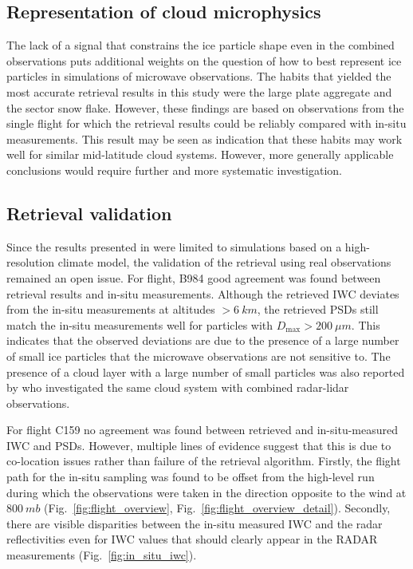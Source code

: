 \documentclass[journal abbreviation, manuscript]{copernicus}
\begin{document}
\subsection{Representation of cloud microphysics}

The lack of a signal that constrains the ice particle shape even in the combined
observations puts additional weights on the question of how to best represent
ice particles in simulations of microwave observations. The habits that yielded
the most accurate retrieval results in this study were the large plate aggregate
and the sector snow flake. However, these findings are based on observations
from the single flight for which the retrieval results could be reliably
compared with in-situ measurements. This result may be seen as indication that
these habits may work well for similar mid-latitude cloud systems. However, more
generally applicable conclusions would require further and more systematic
investigation.

\subsection{Retrieval validation}

Since the results presented in \citet{pfreundschuh19} were limited to
simulations based on a high-resolution climate model, the validation of the
retrieval using real observations remained an open issue. For flight, B984 good
agreement was found between retrieval results and in-situ measurements. Although
the retrieved IWC deviates from the in-situ measurements at altitudes $>
6\ \unit{km}$, the retrieved PSDs still match the in-situ measurements well for
particles with $D_\text{max} > 200\ \unit{\mu m}$. This indicates that the
observed deviations are due to the presence of a large number of small ice
particles that the microwave observations are not sensitive to. The presence of
a cloud layer with a large number of small particles was also reported by
\citet{ewald21} who investigated the same cloud system with combined radar-lidar
observations.

For flight C159 no agreement was found between retrieved and in-situ-measured
IWC and PSDs. However, multiple lines of evidence suggest that this is due to
co-location issues rather than failure of the retrieval algorithm. Firstly, the
flight path for the in-situ sampling was found to be offset from the high-level
run during which the observations were taken in the direction opposite to the
wind at $800\ \unit{mb}$ (Fig.~\ref{fig:flight_overview},
Fig.~\ref{fig:flight_overview_detail}). Secondly, there are visible disparities
between the in-situ measured IWC and the radar reflectivities even for IWC
values that should clearly appear in the RADAR measurements
(Fig.~\ref{fig:in_situ_iwc}).
\end{document}
